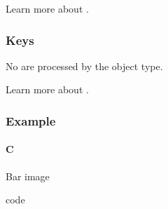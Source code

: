 \documentclass[letterpaper,10pt,english]{sphinxmanual}
\begin{document}
Learn more about {\hyperref[\detokenize{overview/events::doc}]{}}.


\subsubsection{Keys}
\label{\detokenize{object-types/bar:keys}}
No  are processed by the object type.

Learn more about {\hyperref[\detokenize{overview/indev::doc}]{}}.


\subsubsection{Example}
\label{\detokenize{object-types/bar:example}}

\paragraph{C}
\label{\detokenize{object-types/bar:c}}
Bar image

code
\end{document}
